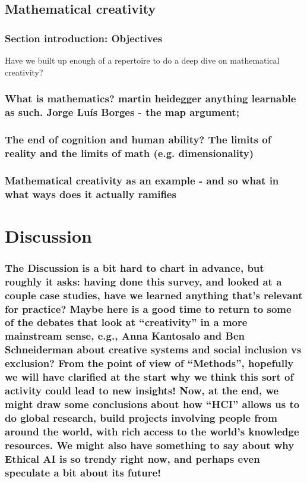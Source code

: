\documentclass[11pt]{article}
\begin{document}
\subsection{Mathematical creativity}
\label{sec:org36972a8}

\subsubsection{Section introduction: Objectives}
\label{sec:org8bbad08}
Have we built up enough of a repertoire to do a deep dive on mathematical creativity?
\subsubsection{What is mathematics? martin heidegger anything learnable as such. Jorge Luís Borges - the map argument;}
\label{sec:org67315d3}
\subsubsection{The end of cognition and human ability? The limits of reality and the limits of math (e.g. dimensionality)}
\label{sec:org5900d63}
\subsubsection{Mathematical creativity as an example - and so what in what ways does it actually ramifies}
\label{sec:orgc390758}

\section{Discussion}
\label{sec:orgb1f7b9a}
\subsubsection{The Discussion is a bit hard to chart in advance, but roughly it asks: having done this survey, and looked at a couple case studies, have we learned anything that's relevant for practice? Maybe here is a good time to return to some of the debates that look at ``creativity'' in a more mainstream sense, e.g., Anna Kantosalo and Ben Schneiderman about creative systems and social inclusion vs exclusion? From the point of view of ``Methods'', hopefully we will have clarified at the start why we think this sort of activity could lead to new insights! Now, at the end, we might draw some conclusions about how ``HCI'' allows us to do global research, build projects involving people from around the world, with rich access to the world’s knowledge resources. We might also have something to say about why Ethical AI is so trendy right now, and perhaps even speculate a bit about its future!}
\label{sec:org2258ed8}
\end{document}
